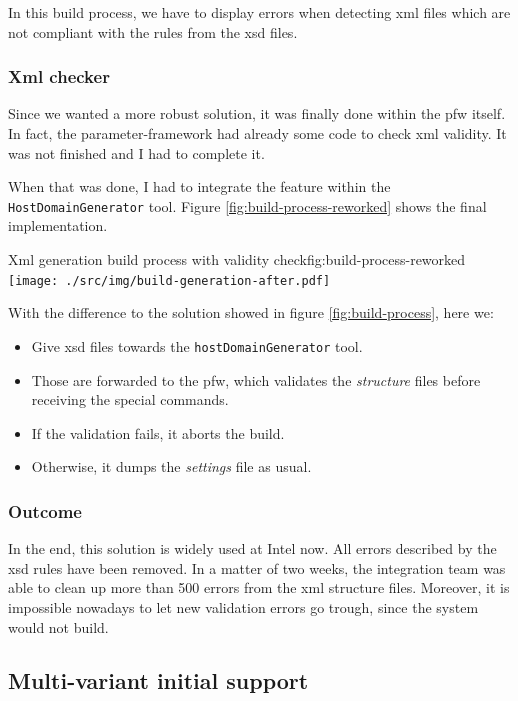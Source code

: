 In this build process, we have to display errors when detecting \gls{xml} files which are not compliant with the rules from the
\gls{xsd} files.

\subsubsection{Xml checker}

Since we wanted a more robust solution, it was finally done within the \gls{pfw} itself.
In fact, the parameter-framework had already some code to check \gls{xml} validity. It was not
finished and I had to complete it.

When that was done, I had to integrate the feature within the \lstinline{HostDomainGenerator} tool.
Figure \ref{fig:build-process-reworked} shows the final implementation.

\begin{figureGraphics}{Xml generation build process with validity check}{fig:build-process-reworked}
    \texttt{[image: ./src/img/build-generation-after.pdf]}
\end{figureGraphics}

With the difference to the solution showed in figure \ref{fig:build-process}, here we:
\begin{itemize}
    \item Give \gls{xsd} files towards the \lstinline{hostDomainGenerator} tool.
    \item Those are forwarded to the \gls{pfw}, which validates the \emph{structure} files before receiving the special commands.
    \item If the validation fails, it aborts the build.
    \item Otherwise, it dumps the \emph{settings} file as usual.
\end{itemize}

\subsubsection{Outcome}
In the end, this solution is widely used at Intel now. All errors described by the \gls{xsd} rules have been removed.
In a matter of two weeks, the integration team was able to clean up more than 500 errors from the \gls{xml} structure files.
Moreover, it is impossible nowadays to let new validation errors go trough, since the system would not build.


\subsection{Multi-variant initial support}
